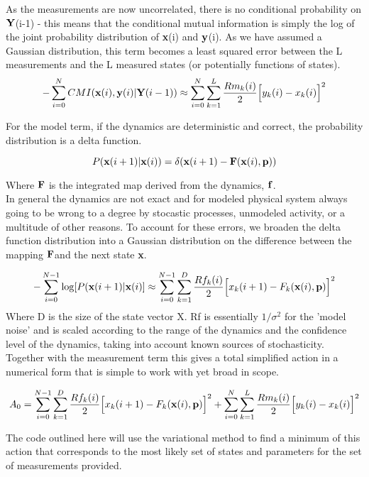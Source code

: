 \documentclass{scrartcl}
\newcommand{\be}{\begin{equation}}
\newcommand{\ee}{\end{equation}}
\def\x{\mbox{{\bf x}}}
\def\Y{\mbox{$\bf{Y}$}}
\def\y{\mbox{$\bf{y}$}}
\def\p{\mbox{$\bf{p}$}}
\def\f{\mbox{$\bf{f}$}}
\def\F{\mbox{$\bf{F}$}}
\begin{document}
As the measurements are now uncorrelated, there is no conditional probability on \Y(i-1) - this means that the conditional mutual information is simply the log of the joint probability distribution of \x(i) and \y(i).  As we have assumed a Gaussian distribution, this term becomes a least squared error between the L measurements and the L measured states (or potentially functions of states).
\be
-\sum_{i=0}^{N}CMI(\x(i),\y(i)|\Y(i-1)) \approx \sum_{i=0}^{N}\sum_{k=1}^{L}\frac{Rm_k(i)}{2}\Big[y_k(i) - x_k(i) \Big]^2 
\ee

For the model term, if the dynamics are deterministic and correct, the probability distribution is a delta function.

\be
P(\x(i+1)|\x(i)) = \delta(\x(i+1) - \F(\x(i),\p))
\ee

Where $\F$ is the integrated map derived from the dynamics, \f.\\

In general the dynamics are not exact and for modeled physical system always going to be wrong to a degree by stocastic processes, unmodeled activity, or a multitude of other reasons.  To account for these errors, we broaden the delta function distribution into a Gaussian distribution on the difference between the mapping \F and the next state \x.

\be
-\sum_{i=0}^{N-1} \log[P(\x(i+1)|\x(i)] \approx \sum_{i=0}^{N-1}\sum_{k=1}^{D}\frac{Rf_k(i)}{2}\Big[x_k(i+1) - F_k(\x(i),\p) \Big]^2 
\ee
Where D is the size of the state vector X.  Rf is essentially $1/\sigma^2$ for the 'model noise' and is scaled according to the range of the dynamics and the confidence level of the dynamics, taking into account known sources of stochasticity.  Together with the measurement term this gives a total simplified action in a numerical form that is simple to work with yet broad in scope.

\be
A_0 = \sum_{i=0}^{N-1}\sum_{k=1}^{D}\frac{Rf_k(i)}{2}\Big[x_k(i+1) - F_k(\x(i),\p) \Big]^2 + \sum_{i=0}^{N}\sum_{k=1}^{L}\frac{Rm_k(i)}{2}\Big[y_k(i) - x_k(i) \Big]^2 
\ee

The code outlined here will use the variational method to find a minimum of this action that corresponds to the most likely set of states and parameters for the set of measurements provided.
\end{document}
